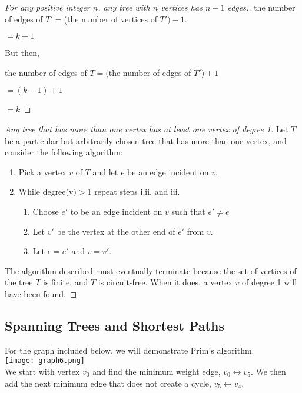 \documentclass[12pt]{article}
\newenvironment{modenumerate}
  {\enumerate\setupmodenumerate}
  {\endenumerate}
\newif\ifmoditem
\newcommand{\setupmodenumerate}{%
  \global\moditemfalse
  \let\origmakelabel\makelabel
  \def\moditem##1{\global\moditemtrue\def\mesymbol{##1}\item}%
  \def\makelabel##1{%
    \origmakelabel{##1\ifmoditem\rlap{\mesymbol}\fi\enspace}%
    \global\moditemfalse}%
}
\begin{document}
\begin{modenumerate}
\begin{proof}[For any positive integer $n$, any tree with $n$ vertices has $n-1$ edges.]
    the number of edges of $T' = $(the number of vertices of $T') - 1$.

    $= k - 1$

    But then,

    the number of edges of $T = ($the number of edges of $T') + 1$

    $= (k-1)+1$

    $= k$
  \end{proof}

  \begin{proof}[Any tree that has more than one vertex has at least one vertex of degree 1]
    Let $T$ be a particular but arbitrarily chosen tree that has more than one vertex, and consider the
    following algorithm:
    \begin{enumerate}
    \item Pick a vertex $v$ of $T$ and let $e$ be an edge incident on $v$.
    \item While degree$($v$) > 1$ repeat steps i,ii, and iii.
      \begin{enumerate}
      \item Choose $e'$ to be an edge incident on $v$ such that $e' \neq e$
      \item Let $v'$ be the vertex at the other end of $e'$ from $v$.
      \item Let $e = e'$ and $v = v'$.
      \end{enumerate}
    \end{enumerate}
    The algorithm described must eventually terminate because the set of vertices of the tree $T$ is finite,
    and $T$ is circuit-free. When it does, a vertex $v$ of degree 1 will have been found.
  \end{proof}
\end{modenumerate}
\setcounter{subsection}{6}
\subsection{Spanning Trees and Shortest Paths}
\begin{modenumerate}
\setcounter{enumi}{4}
\item %
\moditem{*} %
For the graph included below, we will demonstrate Prim's algorithm.\\
\texttt{[image: graph6.png]}\\
We start with vertex $v_{0}$ and find the minimum weight edge, $v_{0}\leftrightarrow v_{5}$. We then add the
next minimum edge that does not create a cycle, $v_{5} \leftrightarrow v_{4}$. 
\item %
\item %
\setcounter{enumi}{17}
\moditem{*} %
\end{modenumerate}
\end{document}
